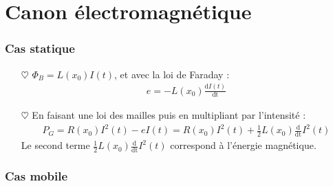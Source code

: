 \documentclass{report}
\begin{document}
\section*{Canon électromagnétique}

\subsubsection*{Cas statique}

\begin{itemize}

	\item[$\heartsuit$] $\Phi_B=L(x_0)I(t)$, et avec la loi de Faraday :
	\begin{align*}
		e=-L(x_0)\frac{\mathrm{d}I(t)}{\mathrm{dt}}
	\end{align*}
	
	\item[$\heartsuit$] En faisant une loi des mailles puis en multipliant par l'intensité :
	\begin{align*}
		P_G=R(x_0)I^2(t)-eI(t)=R(x_0)I^2(t)+\frac{1}{2}L(x_0)\frac{\mathrm{d}} {\mathrm{dt}}I^2(t)
	\end{align*}
	Le second terme $\frac{1}{2}L(x_0)\frac{\mathrm{d}} {\mathrm{dt}}I^2(t)$ correspond à l'énergie magnétique.

\end{itemize}

\subsubsection*{Cas mobile}
\end{document}
